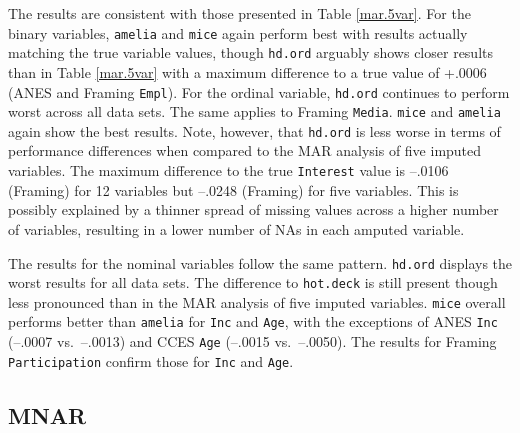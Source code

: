 \documentclass[12pt,econ]{sources/authesis}
\begin{document}
\normalsize

The results are consistent with those presented in Table \ref{mar.5var}. For the binary variables, \texttt{amelia} and \texttt{mice} again perform best with results actually matching the true variable values, though \texttt{hd.ord} arguably shows closer results than in Table \ref{mar.5var} with a maximum difference to a true value of +.0006 (ANES and Framing \texttt{Empl}). For the ordinal variable, \texttt{hd.ord} continues to perform worst across all data sets. The same applies to Framing \texttt{Media}. \texttt{mice} and \texttt{amelia} again show the best results. Note, however, that \texttt{hd.ord} is less worse in terms of performance differences when compared to the MAR analysis of five imputed variables. The maximum difference to the true \texttt{Interest} value is --.0106 (Framing) for 12 variables but --.0248 (Framing) for five variables. This is possibly explained by a thinner spread of missing values across a higher number of variables, resulting in a lower number of NAs in each amputed variable.

The results for the nominal variables follow the same pattern. \texttt{hd.ord} displays the worst results for all data sets. The difference to \texttt{hot.deck} is still present though less pronounced than in the MAR analysis of five imputed variables. \texttt{mice} overall performs better than \texttt{amelia} for \texttt{Inc} and \texttt{Age}, with the exceptions of ANES \texttt{Inc} (--.0007 vs.~--.0013) and CCES \texttt{Age} (--.0015 vs.~--.0050). The results for Framing \texttt{Participation} confirm those for \texttt{Inc} and \texttt{Age}.

\hypertarget{ordmiss-results-mnar}{%
\subsection{MNAR}\label{ordmiss-results-mnar}}
\end{document}
